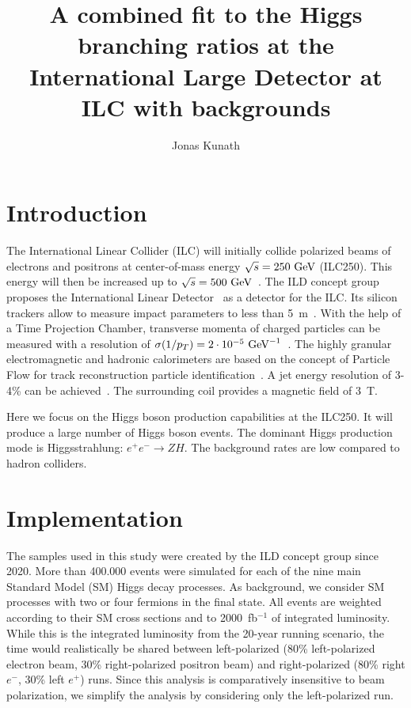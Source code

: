 \documentclass[a4paper,11pt]{article}
\title{A combined fit to the Higgs branching ratios at the International Large Detector at ILC with backgrounds}
\author*[a,\dag]{Jonas Kunath}
\affiliation[a]{Laboratoire Leprince-Ringuet, IN2P3-CNRS, École Polytechnique, Institut Polytechnique de Paris\\
Route de Saclay, 91120 Palaiseau, France}
\newcommand{\eV}{\text{e\kern-0.15ex V}\xspace}
\newcommand{\GeV}{\text{G\eV}\xspace}
\begin{document}
\maketitle

\section{Introduction}
The International Linear Collider (ILC) will initially collide polarized beams
of electrons and positrons at center-of-mass energy $\sqrt{s}=250~\GeV$ (ILC250).
This energy will then be increased up to $\sqrt{s}=500~\GeV$~\cite{ILC_Staging_2017}.
The ILD concept group proposes the International Linear Detector~\cite{ILD_DBD,ILD_IDR}
as a detector for the ILC.
Its silicon trackers allow to measure impact parameters to less than 5~{\textmu}m~\cite{ILD_IDR}.
With the help of a Time Projection Chamber, transverse momenta of charged particles
can be measured with a resolution of $\sigma(1/p_T) = 2 \cdot 10^{-5}~\GeV^{-1}$~\cite{ILD_IDR}.
The highly granular electromagnetic and hadronic calorimeters
are based on the concept of Particle Flow
for track reconstruction particle identification~\cite{ParticleFlow}.
A jet energy resolution of 3-4\% can be achieved~\cite{ILD_IDR}.
The surrounding coil provides a magnetic field of 3~T.

Here we focus on the Higgs boson production capabilities at the ILC250.
It will produce a large number of Higgs boson events.
The dominant Higgs production mode is Higgsstrahlung: $e^+e^- \to ZH$.
The background rates are low compared to hadron colliders.

\section{Implementation}\label{sec:Implementation}
The samples used in this study were created by the ILD concept group since 2020.
More than 400.000 events were simulated for each of the nine main Standard Model (SM)
Higgs decay processes.
As background, we consider SM processes
with two or four fermions in the final state.
All events are weighted according to their SM cross sections
and to 2000~fb$^{-1}$ of integrated luminosity.
While this is the integrated luminosity from the 20-year running scenario,
the time would realistically be shared
between left-polarized
(80\% left-polarized electron beam, 30\% right-polarized positron beam)
and right-polarized (80\% right $e^-$, 30\% left $e^+$) runs.
Since this analysis is comparatively insensitive to beam polarization,
we simplify the analysis by considering only the left-polarized run.
\end{document}
